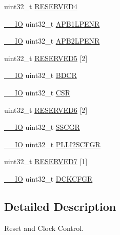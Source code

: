 \begin{DoxyCompactItemize}
\item 
uint32\+\_\+t \hyperlink{struct_r_c_c___type_def_a0f009e4bd1777ac1b86ca27e23361a0e}{R\+E\+S\+E\+R\+V\+E\+D4}
\item 
\hyperlink{core__sc300_8h_aec43007d9998a0a0e01faede4133d6be}{\+\_\+\+\_\+\+IO} uint32\+\_\+t \hyperlink{struct_r_c_c___type_def_a5c8e710c40b642dcbf296201a7ecb2da}{A\+P\+B1\+L\+P\+E\+NR}
\item 
\hyperlink{core__sc300_8h_aec43007d9998a0a0e01faede4133d6be}{\+\_\+\+\_\+\+IO} uint32\+\_\+t \hyperlink{struct_r_c_c___type_def_a7e46c65220f00a6858a5b35b74a37b51}{A\+P\+B2\+L\+P\+E\+NR}
\item 
uint32\+\_\+t \hyperlink{struct_r_c_c___type_def_af9159a971013ef0592be8be3e256a344}{R\+E\+S\+E\+R\+V\+E\+D5} \mbox{[}2\mbox{]}
\item 
\hyperlink{core__sc300_8h_aec43007d9998a0a0e01faede4133d6be}{\+\_\+\+\_\+\+IO} uint32\+\_\+t \hyperlink{struct_r_c_c___type_def_a05be375db50e8c9dd24fb3bcf42d7cf1}{B\+D\+CR}
\item 
\hyperlink{core__sc300_8h_aec43007d9998a0a0e01faede4133d6be}{\+\_\+\+\_\+\+IO} uint32\+\_\+t \hyperlink{struct_r_c_c___type_def_a7e913b8bf59d4351e1f3d19387bd05b9}{C\+SR}
\item 
uint32\+\_\+t \hyperlink{struct_r_c_c___type_def_a30cfd1a2f2eb931bacfd2be965e53d1b}{R\+E\+S\+E\+R\+V\+E\+D6} \mbox{[}2\mbox{]}
\item 
\hyperlink{core__sc300_8h_aec43007d9998a0a0e01faede4133d6be}{\+\_\+\+\_\+\+IO} uint32\+\_\+t \hyperlink{struct_r_c_c___type_def_a52270ad1423c68cd536f62657bb669f5}{S\+S\+C\+GR}
\item 
\hyperlink{core__sc300_8h_aec43007d9998a0a0e01faede4133d6be}{\+\_\+\+\_\+\+IO} uint32\+\_\+t \hyperlink{struct_r_c_c___type_def_ac3beb02dccd9131d6ce55bb29c5fa69f}{P\+L\+L\+I2\+S\+C\+F\+GR}
\item 
uint32\+\_\+t \hyperlink{struct_r_c_c___type_def_abcd04be226dcaaa5a329998927f54222}{R\+E\+S\+E\+R\+V\+E\+D7} \mbox{[}1\mbox{]}
\item 
\hyperlink{core__sc300_8h_aec43007d9998a0a0e01faede4133d6be}{\+\_\+\+\_\+\+IO} uint32\+\_\+t \hyperlink{struct_r_c_c___type_def_a877ad70fcd4a215bc8f9bb31fdc8d3d1}{D\+C\+K\+C\+F\+GR}
\end{DoxyCompactItemize}


\subsection{Detailed Description}
Reset and Clock Control. 

